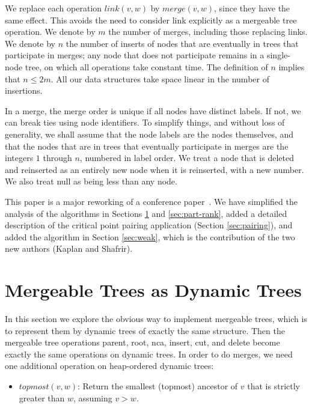 \documentclass[twoside,leqno,twocolumn]{article}
\newcommand{\merge}{\mathit{merge}}
\begin{document}
We replace each operation $\mathit{link}(v, w)$ by $\merge(v, w)$, since they have the same effect.  This avoids the need to consider link explicitly as a mergeable tree operation.  We denote by $m$ the number of merges, including those replacing links. We denote by $n$ the number of inserts of nodes that are eventually in trees that participate in merges; any node that does not participate remains in a single-node tree, on which all operations take constant time. The definition of $n$ implies that $n \le 2m$. All our data structures take space linear in the number of insertions.

In a merge, the merge order is unique if all nodes have distinct labels.  If not, we can break ties using node identifiers.  To simplify things, and without loss of generality, we shall assume that the node labels are the nodes themselves, and that the nodes that are in trees that eventually participate in merges are the integers $1$ through $n$, numbered in label order.  We treat a node that is deleted and reinserted as an entirely new node when it is reinserted, with a new number. We also treat null as being less than any node.


This paper is a major reworking of a conference paper~\cite{GTW06}.  We have simplified the analysis of the algorithms in Sections \ref{sec:dyntrees} and \ref{sec:part-rank}, added a detailed description of the critical point pairing application (Section \ref{sec:pairing}), and added the algorithm in Section \ref{sec:weak}, which is the contribution of the two new authors (Kaplan and Shafrir).



\section{Mergeable Trees as Dynamic Trees}
\label{sec:dyntrees}

In this section we explore the obvious way to implement mergeable trees, which is to represent them by dynamic trees of exactly the same structure.  Then the mergeable tree operations parent, root, nca, insert, cut, and delete become exactly the same operations on dynamic trees.  In order to do merges, we need one additional operation on heap-ordered dynamic trees:

\begin{itemize}
\item $\mathit{topmost}(v,w)$: Return the smallest (topmost) ancestor of $v$ that is strictly greater than $w$, assuming $v>w$.
\end{itemize}
\end{document}

